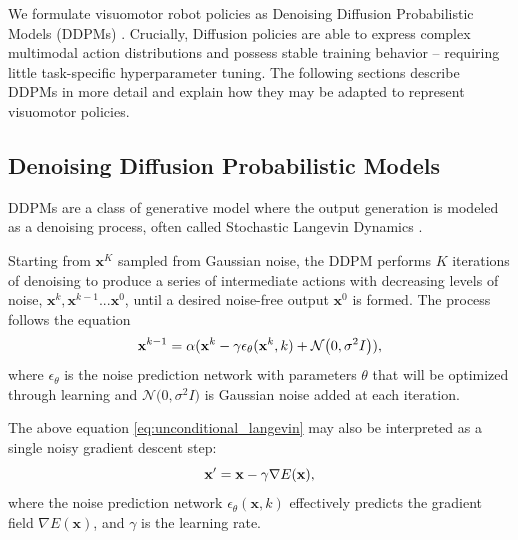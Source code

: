 We formulate visuomotor robot policies as Denoising Diffusion Probabilistic Models (DDPMs) \cite{ho2020denoising}. Crucially, Diffusion policies are able to express complex multimodal action distributions and possess stable training behavior -- requiring little task-specific hyperparameter tuning.
The following sections describe DDPMs in more detail and explain how they may be adapted to represent visuomotor policies. 

\subsection{Denoising Diffusion Probabilistic Models} 
\label{sec:ddpm}
DDPMs are a class of generative model where the output generation is modeled as a denoising process, often called Stochastic Langevin Dynamics \cite{welling2011bayesian}. 

Starting from $\mathbf{x}^K$ sampled from Gaussian noise, the DDPM performs $K$ iterations of denoising to produce a series of intermediate actions with decreasing levels of noise,
$\mathbf{x}^k, \mathbf{x}^{k-1} ...\mathbf{x}^{0} $, until a desired noise-free output $\mathbf{x}^0$ is formed.  
The process follows the equation
\vspace{-1mm}
\begin{equation}
    \textbf{x}^{k-1}=\alpha(\textbf{x}^{k}-\gamma\epsilon_\theta(\mathbf{x}^k,k) + \mathcal{N} \bigl(0, \sigma^2 I \bigl)),
    \label{eq:unconditional_langevin}
\vspace{-1mm}
\end{equation}
where $\epsilon_\theta$ is the noise prediction network with parameters $\theta$ that will be optimized through learning and $\mathcal{N} \bigl(0, \sigma^2 I \bigl)$ is Gaussian noise added at each iteration. 


The above equation \ref{eq:unconditional_langevin} may also be interpreted as a single noisy gradient descent step: 
\vspace{-2mm}
\begin{equation}
    \mathbf{x}'=\mathbf{x}-\gamma\nabla E(\mathbf{x}),
    \label{eq:gradient_descent}
\vspace{-1mm}
\end{equation}
where the noise prediction network $\epsilon_\theta(\mathbf{x},k)$ effectively predicts the gradient field $\nabla E(\mathbf{x})$, and  $\gamma$ is the learning rate. 

